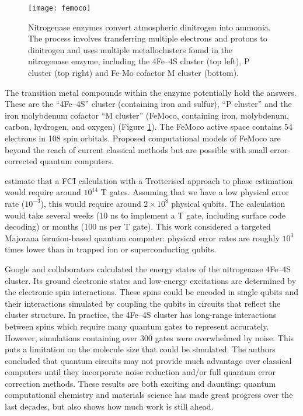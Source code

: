 \documentclass[10pt]{iopart}
\begin{document}
\begin{figure}[ht!]
\centering
\texttt{[image: femoco]}
\caption{Nitrogenase enzymes convert atmospheric dinitrogen into ammonia. The process involves transferring multiple electrons and protons to dinitrogen and uses multiple metalloclusters found in the nitrogenase enzyme, including the 4Fe--4S cluster (top left), P cluster (top right) and Fe-Mo cofactor M cluster (bottom).}
\label{fig:femoco}
\end{figure}

The transition metal compounds within the enzyme potentially hold the answers. These are the ``4Fe--4S'' cluster (containing iron and sulfur), ``P cluster'' and the iron molybdenum cofactor ``M cluster'' (FeMoco, containing iron, molybdenum, carbon, hydrogen, and oxygen) \cite{Hoffman2014} (Figure \ref{fig:femoco}). The FeMoco active space contains 54 electrons in 108 spin orbitals.  Proposed computational models of FeMoco are beyond the reach of current classical methods but are possible with small error-corrected quantum computers. 

\citeauthor{Reiher2017} \cite{Reiher2017} estimate that a FCI calculation with a Trotterised approach to phase estimation would require around $10^{14}$ T gates. Assuming that we have a low physical error rate ($10^{-3}$), this would require around $2 \times 10^8$ physical qubits. The calculation would take several weeks (10 ns to implement a T gate, including surface code decoding) or months (100 ns per T gate). This work considered a targeted Majorana fermion-based quantum computer: physical error rates are roughly $10^3$ times lower than in trapped ion or superconducting qubits.

Google and collaborators \cite{Tazhigulov2022} calculated the energy states of the nitrogenase 4Fe--4S cluster. Its ground electronic states and low-energy excitations are determined by the electronic spin interactions. These spins could be encoded in single qubits and their interactions simulated by coupling the qubits in circuits that reflect the cluster structure. In practice, the 4Fe--4S cluster has long-range interactions between spins which require many quantum gates to represent accurately. However, simulations containing over 300 gates were overwhelmed by noise. This puts a limitation on the molecule size that could be simulated. The authors concluded that  quantum circuits may not provide much advantage over classical computers until they incorporate noise reduction and/or full quantum error correction methods. These results are both exciting and daunting: quantum computational chemistry and materials science has made great progress over the last decades, but \cite{Tazhigulov2022} also shows how much work is still ahead.
\end{document}
